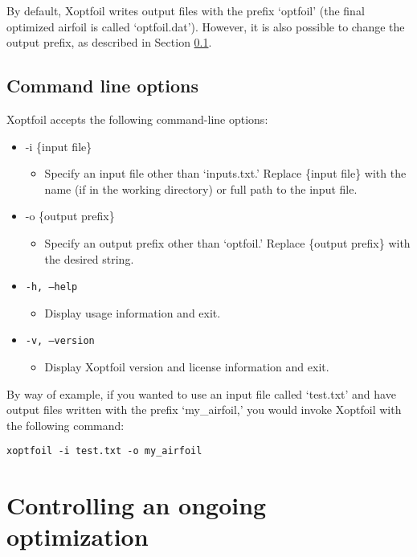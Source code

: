 \documentclass[11pt]{article}
\begin{document}
By default, Xoptfoil writes output files with the prefix `optfoil' (the final optimized
airfoil is called `optfoil.dat'). However, it is also possible to change the output
prefix, as described in Section \ref{sec:CLOs}.

\subsection{Command line options}\label{sec:CLOs}

Xoptfoil accepts the following command-line options:

\begin{itemize}
  \item{-i \{input file\}
  \begin{itemize}
    \item{Specify an input file other than `inputs.txt.' Replace \{input file\} with the
          name (if in the working directory) or full path to the input file.}
  \end{itemize}}
  \item{-o \{output prefix\}
  \begin{itemize}
    \item{Specify an output prefix other than `optfoil.' Replace \{output prefix\} with the
          desired string.}
  \end{itemize}}
  \item{\texttt{-h, --help}
  \begin{itemize}
    \item{Display usage information and exit.}
  \end{itemize}}
  \item{\texttt{-v, --version}
  \begin{itemize}
    \item{Display Xoptfoil version and license information and exit.}
  \end{itemize}}
\end{itemize}

By way of example, if you wanted to use an input file called `test.txt' and have output
files written with the prefix `my\_airfoil,' you would invoke Xoptfoil with the following
command:

\begin{verbatim}
xoptfoil -i test.txt -o my_airfoil
\end{verbatim}

\section{Controlling an ongoing optimization}\label{sec:run_control}
\end{document}
